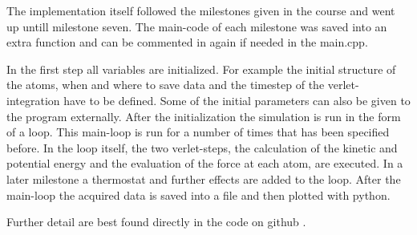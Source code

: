 The implementation itself followed the milestones given in the course and went up untill milestone seven. 
The main-code of each milestone was saved into an extra function and can be commented in again if needed in the main.cpp.

\par 
In the first step all variables are initialized. For example the initial structure of the atoms, when and where to save data and the timestep of the verlet-integration have to be defined. Some of the initial parameters can also be given to the program externally. After the initialization the simulation is run in the form of a loop. This main-loop is run for a number of times that has been specified before. In the loop itself, the two verlet-steps, the calculation of the kinetic and potential energy and the evaluation of the force at each atom, are executed. In a later milestone a thermostat and further effects are added to the loop. 
After the main-loop the acquired data is saved into a file and then plotted with python. 

\par 
Further detail are best found directly in the code on github \cite{molDymGithub}.



